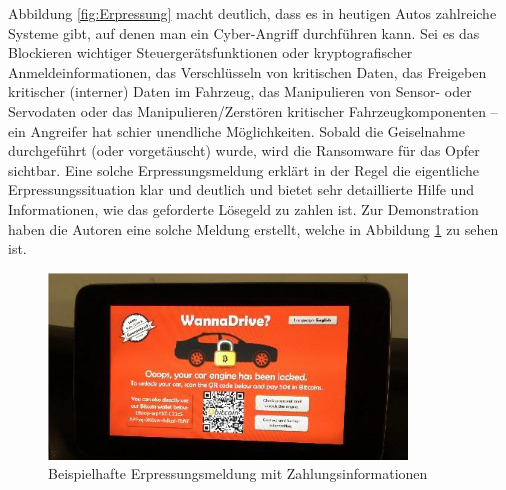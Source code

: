 Abbildung \ref{fig:Erpressung} macht deutlich, dass es in heutigen Autos zahlreiche Systeme gibt, 
auf denen man ein Cyber-Angriff durchführen kann. Sei es das Blockieren wichtiger 
Steuergerätsfunktionen oder kryptografischer Anmeldeinformationen, das Verschlüsseln 
von kritischen Daten, das Freigeben kritischer (interner) Daten im Fahrzeug, das 
Manipulieren von Sensor- oder Servodaten oder das Manipulieren/Zerstören kritischer 
Fahrzeugkomponenten – ein Angreifer hat schier unendliche Möglichkeiten. 
\newline
Sobald die Geiselnahme durchgeführt (oder vorgetäuscht) wurde, wird die Ransomware 
für das Opfer sichtbar. Eine solche Erpressungsmeldung erklärt in der Regel die eigentliche 
Erpressungssituation klar und deutlich und bietet sehr detaillierte Hilfe und Informationen, 
wie das geforderte Lösegeld zu zahlen ist. Zur Demonstration haben die Autoren eine 
solche Meldung erstellt, welche in Abbildung \ref{fig:WannaDrive} zu sehen ist. 
\newline

\begin{figure}[htbp!]
    \centering
    \includegraphics[width=0.85\textwidth]{Images/WannaDrive.png}
    \caption{Beispielhafte Erpressungsmeldung mit Zahlungsinformationen
    \cite{M.Wolf.2017}}
    \label{fig:WannaDrive}
\end{figure}
